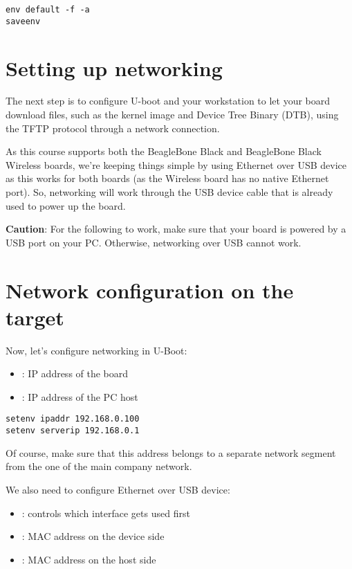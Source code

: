 \begin{verbatim}
env default -f -a
saveenv
\end{verbatim}

\section{Setting up networking}

The next step is to configure U-boot and your workstation to let your
board download files, such as the kernel image and Device Tree Binary
(DTB), using the TFTP protocol through a network connection.

As this course supports both the BeagleBone Black and BeagleBone Black
Wireless boards, we're keeping things simple by using Ethernet over USB
device as this works for both boards (as the Wireless board has no
native Ethernet port). So, networking will work through the USB device
cable that is already used to power up the board.

{\bf Caution}: For the following to work, make sure that your board
is powered by a USB port on your PC. Otherwise, networking over USB
cannot work.

\section{Network configuration on the target}
Now, let's configure networking in U-Boot:

\begin{itemize}
  \item {}: IP address of the board
  \item {}: IP address of the PC host
\end{itemize}

\begin{verbatim}
setenv ipaddr 192.168.0.100
setenv serverip 192.168.0.1
\end{verbatim}

Of course, make sure that this address belongs to a separate network
segment from the one of the main company network.

We also need to configure Ethernet over USB device:
\begin{itemize}
  \item {}: controls which interface gets used first
  \item {}: MAC address on the device side
  \item {}: MAC address on the host side  
\end{itemize}

